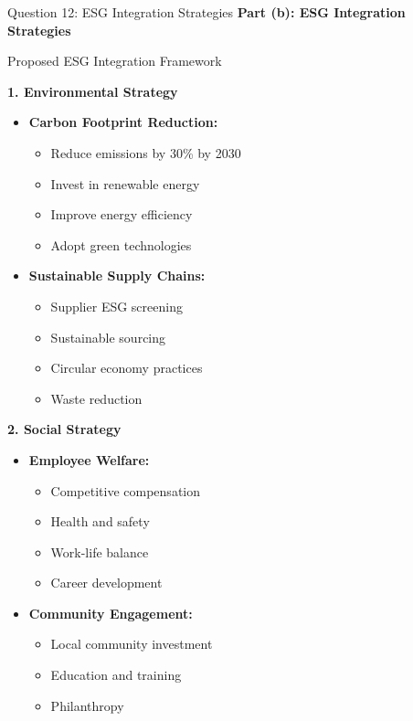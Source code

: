 \documentclass[aspectratio=169]{beamer}
\newcommand{\question}[1]{{\large\bfseries\color{crimson}#1}}
\newcommand{\subquestion}[1]{{\bfseries\color{darkgreen}#1}}
\begin{document}
	\begin{frame}{Question 12: ESG Integration Strategies}
		\question{Part (b): ESG Integration Strategies}
		
		\begin{block}{Proposed ESG Integration Framework}
			
			\subquestion{1. Environmental Strategy}
			\begin{itemize}
				\item \textbf{Carbon Footprint Reduction:}
				\begin{itemize}
					\item Reduce emissions by 30\% by 2030
					\item Invest in renewable energy
					\item Improve energy efficiency
					\item Adopt green technologies
				\end{itemize}
				\item \textbf{Sustainable Supply Chains:}
				\begin{itemize}
					\item Supplier ESG screening
					\item Sustainable sourcing
					\item Circular economy practices
					\item Waste reduction
				\end{itemize}
			\end{itemize}
			
			\subquestion{2. Social Strategy}
			\begin{itemize}
				\item \textbf{Employee Welfare:}
				\begin{itemize}
					\item Competitive compensation
					\item Health and safety
					\item Work-life balance
					\item Career development
				\end{itemize}
				\item \textbf{Community Engagement:}
				\begin{itemize}
					\item Local community investment
					\item Education and training
					\item Philanthropy
				\end{itemize}
			\end{itemize}
		\end{block}
	\end{frame}
	
\end{document}
